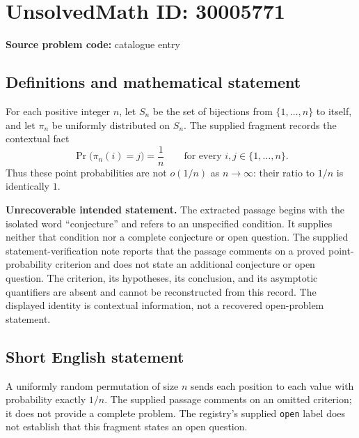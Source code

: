 \documentclass[11pt]{article}
\begin{document}
\section*{UnsolvedMath ID: 30005771}
\textbf{Source problem code:} catalogue entry
\subsection{Definitions and mathematical statement}
For each positive integer \(n\), let \(S_n\) be the set of bijections from \(\{1,\ldots,n\}\) to itself, and let \(\pi_n\) be uniformly distributed on \(S_n\). The supplied fragment records the contextual fact
\[
\Pr\bigl(\pi_n(i)=j\bigr)=\frac{1}{n}
\qquad\text{for every }i,j\in\{1,\ldots,n\}.
\]
Thus these point probabilities are not \(o(1/n)\) as \(n\to\infty\): their ratio to \(1/n\) is identically \(1\).

\textbf{Unrecoverable intended statement.} The extracted passage begins with the isolated word ``conjecture'' and refers to an unspecified condition. It supplies neither that condition nor a complete conjecture or open question. The supplied statement-verification note reports that the passage comments on a proved point-probability criterion and does not state an additional conjecture or open question. The criterion, its hypotheses, its conclusion, and its asymptotic quantifiers are absent and cannot be reconstructed from this record. The displayed identity is contextual information, not a recovered open-problem statement.
\subsection{Short English statement}
A uniformly random permutation of size \(n\) sends each position to each value with probability exactly \(1/n\). The supplied passage comments on an omitted criterion; it does not provide a complete problem. The registry's supplied \texttt{open} label does not establish that this fragment states an open question.
\end{document}

